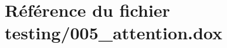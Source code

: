 \hypertarget{005__attention_8dox}{}\section{Référence du fichier testing/005\+\_\+attention.dox}
\label{005__attention_8dox}
